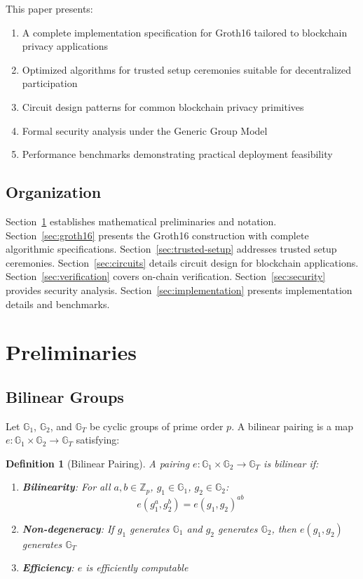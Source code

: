 \documentclass[11pt,a4paper]{article}
\newtheorem{definition}[theorem]{Definition}
\newcommand{\G}{\mathbb{G}}
\newcommand{\Z}{\mathbb{Z}}
\begin{document}
This paper presents:
\begin{enumerate}[label=(\roman*)]
    \item A complete implementation specification for Groth16 tailored to blockchain privacy applications
    \item Optimized algorithms for trusted setup ceremonies suitable for decentralized participation
    \item Circuit design patterns for common blockchain privacy primitives
    \item Formal security analysis under the Generic Group Model
    \item Performance benchmarks demonstrating practical deployment feasibility
\end{enumerate}

\subsection{Organization}

Section~\ref{sec:preliminaries} establishes mathematical preliminaries and notation. Section~\ref{sec:groth16} presents the Groth16 construction with complete algorithmic specifications. Section~\ref{sec:trusted-setup} addresses trusted setup ceremonies. Section~\ref{sec:circuits} details circuit design for blockchain applications. Section~\ref{sec:verification} covers on-chain verification. Section~\ref{sec:security} provides security analysis. Section~\ref{sec:implementation} presents implementation details and benchmarks.

\section{Preliminaries}
\label{sec:preliminaries}

\subsection{Bilinear Groups}

Let $\G_1$, $\G_2$, and $\G_T$ be cyclic groups of prime order $p$. A bilinear pairing is a map $e: \G_1 \times \G_2 \to \G_T$ satisfying:

\begin{definition}[Bilinear Pairing]
A pairing $e: \G_1 \times \G_2 \to \G_T$ is bilinear if:
\begin{enumerate}[label=(\roman*)]
    \item \textbf{Bilinearity}: For all $a, b \in \Z_p$, $g_1 \in \G_1$, $g_2 \in \G_2$:
    \[
    e(g_1^a, g_2^b) = e(g_1, g_2)^{ab}
    \]
    \item \textbf{Non-degeneracy}: If $g_1$ generates $\G_1$ and $g_2$ generates $\G_2$, then $e(g_1, g_2)$ generates $\G_T$
    \item \textbf{Efficiency}: $e$ is efficiently computable
\end{enumerate}
\end{definition}
\end{document}

